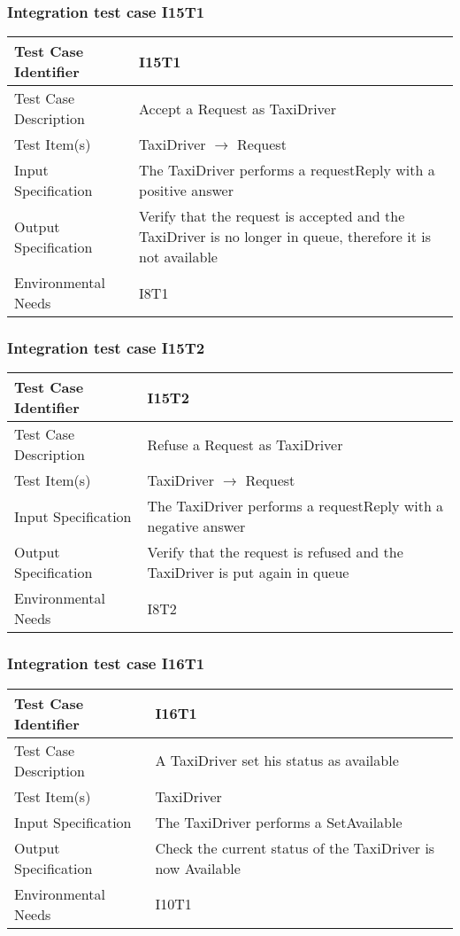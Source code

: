 \subsubsection{Integration test case I15T1}
\begin{center}
  \begin{tabular}{ |l p{10cm}| } \hline
    Test Case Identifier & I15T1 \\ \hline
    Test Case Description & Accept a Request as TaxiDriver \\ \hline
    Test Item(s) & TaxiDriver $\rightarrow$ Request \\ \hline
    Input Specification & The TaxiDriver performs a requestReply with a positive answer  \\ \hline
    Output Specification & Verify that the request is accepted and the TaxiDriver is no longer in queue, therefore it is not available \\ \hline
    Environmental Needs & I8T1 \\ \hline
  \end{tabular}
\end{center}
\subsubsection{Integration test case I15T2}
\begin{center}
  \begin{tabular}{ |l p{10cm}| } \hline
    Test Case Identifier & I15T2 \\ \hline
    Test Case Description & Refuse a Request as TaxiDriver \\ \hline
    Test Item(s) & TaxiDriver $\rightarrow$ Request \\ \hline
    Input Specification & The TaxiDriver performs a requestReply with a negative answer \\ \hline
    Output Specification & Verify that the request is refused and the TaxiDriver is put again in queue \\ \hline
    Environmental Needs & I8T2 \\ \hline
  \end{tabular}
\end{center}
\subsubsection{Integration test case I16T1}
\begin{center}
  \begin{tabular}{ |l p{10cm}| } \hline
    Test Case Identifier & I16T1 \\ \hline
    Test Case Description & A TaxiDriver set his status as available  \\ \hline
    Test Item(s) & TaxiDriver \\ \hline
    Input Specification & The TaxiDriver performs a SetAvailable \\ \hline
    Output Specification & Check the current status of the TaxiDriver is now Available \\ \hline
    Environmental Needs & I10T1 \\ \hline
  \end{tabular}
\end{center}
